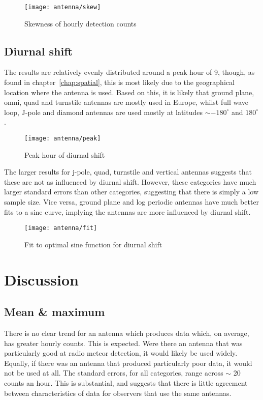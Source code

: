 \begin{figure}[h!]
	\centering
	\texttt{[image: antenna/skew]}
	\caption{Skewness of hourly detection counts
		\label{fig:ant:skew}}
\end{figure}

\subsection{Diurnal shift}
The results are relatively evenly distributed around a peak hour of 9, though, as found in chapter~\ref{chap:spatial}, this is most likely due to the geographical location where the antenna is used. Based on this, it is likely that ground plane, omni, quad and turnstile antennas are mostly used in Europe, whilst full wave loop, J-pole and diamond antennas are used mostly at latitudes $\sim -180^{\circ}$ and $180^{\circ}$.

\begin{figure}[h!]
	\centering
	\texttt{[image: antenna/peak]}
	\caption{Peak hour of diurnal shift
		\label{fig:ant:peak}}
\end{figure}

The larger results for j-pole, quad, turnstile and vertical antennas suggests that these are not as influenced by diurnal shift. However, these categories have much larger standard errors than other categories, suggesting that there is simply a low sample size. Vice versa, ground plane and log periodic antennas have much better fits to a sine curve, implying the antennas are more influenced by diurnal shift.
\begin{figure}[h!]
	\centering
	\texttt{[image: antenna/fit]}
	\caption{Fit to optimal sine function for diurnal shift
		\label{fig:ant:fit}}
\end{figure}

\section{Discussion}
\subsection{Mean \& maximum}
There is no clear trend for an antenna which produces data which, on average, has greater hourly counts. This is expected. Were there an antenna that was particularly good at radio meteor detection, it would likely be used widely. Equally, if there was an antenna that produced particularly poor data, it would not be used at all. The standard errors, for all categories, range across $\sim$ 20 counts an hour. This is substantial, and suggests that there is little agreement between characteristics of data for observers that use the same antennas.
